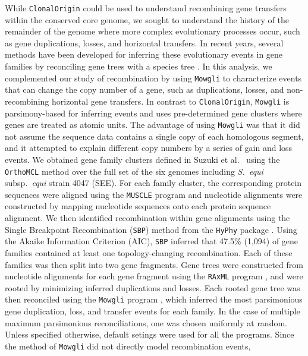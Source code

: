 \documentclass[10pt]{article}
\let\citep\cite
\let\citet\cite
\begin{document}
While \texttt{ClonalOrigin} could be used to understand recombining gene
transfers within the conserved core genome, we sought to understand the history
of the remainder of the genome where more complex evolutionary processes occur,
such as gene duplications, losses, and horizontal transfers.  In recent years,
several methods have been developed for inferring these evolutionary events in
gene families by reconciling gene trees with a species tree
\citep{David2011,Doyon2011,Tofigh2011}.  In this analysis, we complemented our
study of recombination by using \texttt{Mowgli} \citep{Doyon2011} to
characterize events that can change the copy number of a gene, such as
duplications, losses, and non-recombining horizontal gene transfers.  In
contrast to \texttt{ClonalOrigin}, \texttt{Mowgli} is parsimony-based for
inferring events and uses pre-determined gene clusters where genes are treated
as atomic units.  The advantage of using \texttt{Mowgli} was that it did not
assume the sequence data contains a single copy of each homologous segment, and
it attempted to explain different copy numbers by a series of gain and loss
events.  We obtained gene family clusters defined in Suzuki et al.\ \citet{Suzuki2011} using
the \texttt{OrthoMCL} method \citep{Li2003} over the full set of the six genomes
including \textit{S.\ equi} subsp.\textit{\ equi} strain 4047 (SEE).  For each
family cluster, the corresponding protein sequences were aligned using the
\texttt{MUSCLE} program \citep{Edgar2004a} and nucleotide alignments were
constructed by mapping nucleotide sequences onto each protein sequence
alignment. We then identified recombination within gene alignments using the
Single Breakpoint Recombination (\texttt{SBP}) method from the \texttt{HyPhy}
package \citep{KosakovskyPond2006}.  Using the Akaike Information Criterion
(AIC), \texttt{SBP} inferred that 47.5\% (1,094) of gene families contained at
least one topology-changing recombination. Each of these families was then split
into two gene fragments.  Gene trees were constructed from nucleotide alignments
for each gene fragment using the \texttt{RAxML} program \citep{Stamatakis2006},
and were rooted by minimizing inferred duplications and losses.  Each rooted
gene tree was then reconciled using the \texttt{Mowgli} program
\citep{Doyon2011}, which inferred the most parsimonious gene duplication, loss,
and transfer events for each family.  In the case of multiple maximum
parsimonious reconciliations, one was chosen uniformly at random.  Unless
specified otherwise, default setings were used for all the programs.  Since the
method of \texttt{Mowgli} did not directly model recombination events,
\end{document}

